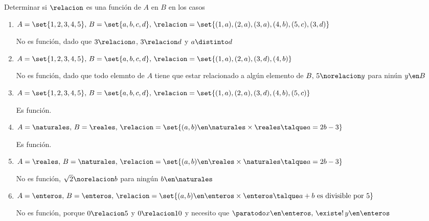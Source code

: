 \begin{enunciado}{\ejercicio}
  Determinar si $\relacion$ es una función de $A$ en $B$ en los casos
\end{enunciado}
  \begin{enumerate}[label=\roman*)]
    \item $A = \set{1,2,3,4,5},\, B = \set{a,b,c,d},\, \relacion = \set{(1,a), (2,a),(3,a),(4,b),(5,c),(3,d)} $\par
          No es función, dado que $3 \relacion a$, $3 \relacion d$ y $a \distinto d$

    \item $A = \set{1,2,3,4,5},\, B = \set{a,b,c,d},\, \relacion = \set{(1,a), (2,a),(3,d),(4,b)}$\par
          No es función, dado que todo elemnto de $A$ tiene que estar relacionado a algún elemento de $B,\, 5 \norelacion y$ para ninún $ y \en B$

    \item $A = \set{1,2,3,4,5},\, B = \set{a,b,c,d},\, \relacion = \set{(1,a), (2,a),(3,d),(4,b),(5,c)} $\par
          Es función.

    \item $A = \naturales,\, B = \reales, \, \relacion = \set{(a,b) \en \naturales \times \reales \talque a = 2b - 3} $\par
          Es función.

    \item $A = \reales,\, B = \naturales, \, \relacion = \set{(a,b) \en \reales \times \naturales \talque a = 2b - 3} $\par
          No es función, $\sqrt{2} \norelacion b$ para ningún $b \en \naturales$
    \item $A = \enteros,\, B = \enteros, \, \relacion = \set{(a,b) \en \enteros \times \enteros \talque a +b \text{ es divisible por }5} $\par
          No es función, porque $0 \relacion 5$ y $0 \relacion 10$ y necesito que $\paratodo x \en \enteros,\, \existe!\, y \en \enteros$
  \end{enumerate}
